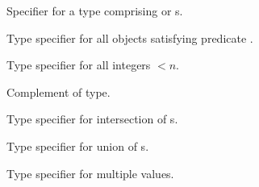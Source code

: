 \begin{LIST}{1cm}
  {
  Specifier for a type comprising  or s.
  }

  {
  Type specifier for all objects satisfying predicate . 
  }

  {
  Type specifier for all integers $<n$.
  }

  {
  Complement of type.
  }

  {
  Type specifier for intersection of s.
  }

  {
  Type specifier for union of s.
  }

  {
  Type specifier for multiple values.
  }

  \end{LIST}



